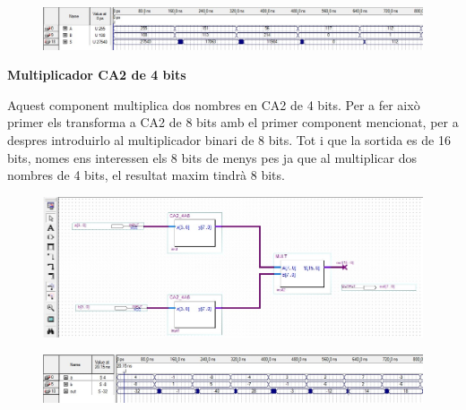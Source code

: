 \documentclass[12pt, a4papre]{article}
\begin{document}
	\begin{center}
	\begin{figure}[H]
		\begin{center}
		\includegraphics[width=150mm]{multbin8bitssimul.jpeg}
		\end{center}
	\end{figure}
	
	\end{center}
	
	
	
	
	\textbf{\large{Multiplicador CA2 de 4 bits}}
	
	Aquest component multiplica dos nombres en CA2 de 4 bits. Per a fer això primer els transforma a CA2 de 8 bits amb el primer component mencionat, per a despres introduirlo al multiplicador binari de 8 bits. Tot i que la sortida es de 16 bits, nomes ens interessen els 8 bits de menys pes ja que al multiplicar dos nombres de 4 bits, el resultat maxim tindrà 8 bits.
	
	
	\begin{center}
	\begin{figure}[H]
		\begin{center}
		\includegraphics[width=150mm]{multCA2_4B.jpeg}
		\end{center}
	\end{figure}
	
	\end{center}
	\begin{center}
	\begin{figure}[H]
		\begin{center}
		\includegraphics[width=150mm]{multCA2_4Bsimul.jpeg}
		\end{center}
	\end{figure}
	
	\end{center}
	
\end{document}
